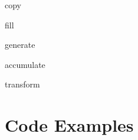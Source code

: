 \documentclass[notes]{beamer}
\begin{document}
\begin{frame}{copy}

\end{frame}

\begin{frame}{fill}

\end{frame}

\begin{frame}{generate}

\end{frame}

\begin{frame}{accumulate}

\end{frame}

\begin{frame}{transform}

\end{frame}

\section{Code Examples}

\end{document}

